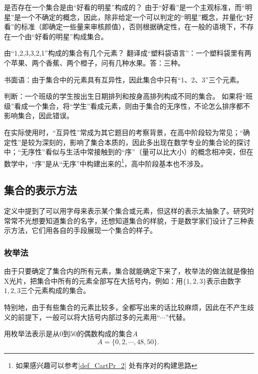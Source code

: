\begin{example}{是否存在一个集合是由“好看的明星”构成的？}
由于“好看”是一个主观标准，而“明星”是一个不确定的概念，因此，除非给定一个可以判定的“明星”概念，并量化“好看”的标准（即确定一些量来审核颜值），否则根据确定性，在一般的语境下，不存在一个由“好看的明星”构成集合。
\end{example}

\begin{example}{由“1,2,3,3,2,1”构成的集合有几个元素？}
翻译成“塑料袋语言”：一个塑料袋里有两个苹果、两个香蕉、两个橙子，问有几种水果。答：三种。

书面语：由于集合中的元素具有互异性，因此集合中只有“1、2、3”三个元素。
\end{example}

\begin{example}{判断：一个班级的学生按出生日期排列和按身高排列构成不同的集合。}
如果将“班级”看成一个集合，将“学生”看成元素，则由于集合的无序性，不论怎么排序都不影响集合，因此错误。
\end{example}

在实际使用时，“互异性”常成为其它题目的考察背景，在高中阶段较为常见；“确定性”是较为深刻的，影响了集合本质的，因此多出现在数学专业的集合论的探讨中；“无序性”看似与生活中常接触到的“序”（量可以比大小）的概念相冲突，但在数学中，“序”是从“无序”中构建出来的\footnote{如果感兴趣可以参考\autoref{def_CartPr_2} 处有序对的构建思路}，高中阶段基本也不涉及。

\subsection{集合的表示方法}

定义中提到了可以用字母来表示某个集合或元素，但这样的表示太抽象了。研究时常常不光想要知道集合的名字，还想知道集合的样貌，于是数学家们设计了三种表示方法，它们用各自的手段展现一个集合的样子。

\subsubsection{枚举法}

由于只要确定了集合内的所有元素，集合就能确定下来了，枚举法的做法就是像拍X光片，把集合中所有的元素全部写在大括号内，例如：用$\{1,2,3\}$表示由数字$1,2,3$三个元素构成的集合。

特别地，由于有些集合的元素比较多，全都写出来的话比较麻烦，因此在不产生歧义的前提下，一般可以将大括号内部过多的元素用“$\cdots$”代替。

\begin{example}{用枚举法表示是从$0$到$50$的偶数构成的集合$A$}
$$A=\{0,2, \cdots ,48,50\}.~$$
\end{example}

